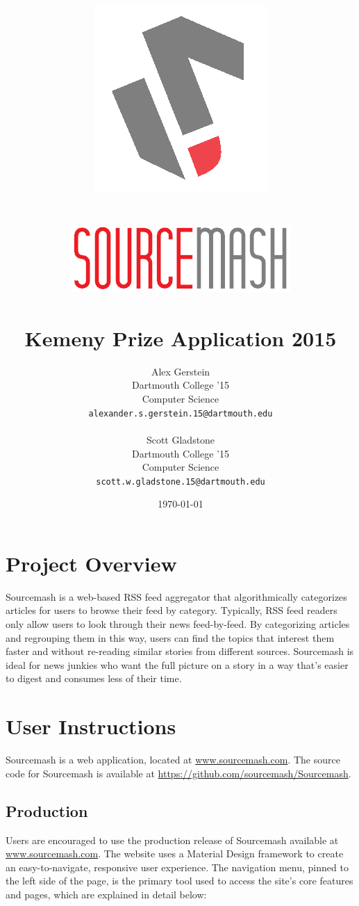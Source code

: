 \documentclass[11pt]{article}
\title{\includegraphics[scale=0.65]{solologo} \\~\\ \includegraphics[scale=0.75]{logotext} \\~\\ Kemeny Prize Application 2015}
\author{
	Alex Gerstein \\ Dartmouth College '15 \\ Computer Science \\ \texttt{alexander.s.gerstein.15@dartmouth.edu}
	\\ \\
	Scott Gladstone \\ Dartmouth College '15 \\ Computer Science \\ \texttt{scott.w.gladstone.15@dartmouth.edu}
	}
\date{\today}
\begin{document}
\maketitle


\pagebreak
\section{Project Overview}

Sourcemash is a web-based RSS feed aggregator that algorithmically categorizes articles for users to browse their feed by category. Typically, RSS feed readers only allow users to look through their news feed-by-feed. By categorizing articles and regrouping them in this way, users can find the topics that interest them faster and without re-reading similar stories from different sources. Sourcemash is ideal for news junkies who want the full picture on a story in a way that's easier to digest and consumes less of their time.


\section{User Instructions}

Sourcemash is a web application, located at \url{www.sourcemash.com}. The source code for Sourcemash is available at \url{https://github.com/sourcemash/Sourcemash}.

\subsection{Production}

Users are encouraged to use the production release of Sourcemash available at \url{www.sourcemash.com}. The website uses a Material Design framework\cite{Materialize} to create an easy-to-navigate, responsive user experience. The navigation menu, pinned to the left side of the page, is the primary tool used to access the site's core features and pages, which are explained in detail below:
\end{document}
